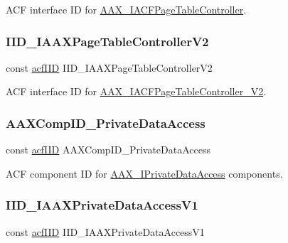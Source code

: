 A\+CF interface ID for \mbox{\hyperlink{a01733}{A\+A\+X\+\_\+\+I\+A\+C\+F\+Page\+Table\+Controller}}. 

\mbox{\label{a00683_aa7c11e4b5a6663039359831c0869c0a7}} 
\subsubsection{\texorpdfstring{IID\_IAAXPageTableControllerV2}{IID\_IAAXPageTableControllerV2}}
{\footnotesize\ttfamily const \mbox{\hyperlink{a00269_a59df0b41744eee7a066787aaedf97f67}{acf\+I\+ID}} I\+I\+D\+\_\+\+I\+A\+A\+X\+Page\+Table\+Controller\+V2}



A\+CF interface ID for \mbox{\hyperlink{a01737}{A\+A\+X\+\_\+\+I\+A\+C\+F\+Page\+Table\+Controller\+\_\+\+V2}}. 

\mbox{\label{a00683_a4d947cbe546fdaa1397264c47ddb96d2}} 
\subsubsection{\texorpdfstring{AAXCompID\_PrivateDataAccess}{AAXCompID\_PrivateDataAccess}}
{\footnotesize\ttfamily const \mbox{\hyperlink{a00269_a59df0b41744eee7a066787aaedf97f67}{acf\+I\+ID}} A\+A\+X\+Comp\+I\+D\+\_\+\+Private\+Data\+Access}



A\+CF component ID for \mbox{\hyperlink{a01865}{A\+A\+X\+\_\+\+I\+Private\+Data\+Access}} components. 

\mbox{\label{a00683_aa501391f1c951a2cf295dadfea936a49}} 
\subsubsection{\texorpdfstring{IID\_IAAXPrivateDataAccessV1}{IID\_IAAXPrivateDataAccessV1}}
{\footnotesize\ttfamily const \mbox{\hyperlink{a00269_a59df0b41744eee7a066787aaedf97f67}{acf\+I\+ID}} I\+I\+D\+\_\+\+I\+A\+A\+X\+Private\+Data\+Access\+V1}



